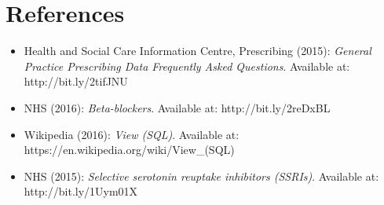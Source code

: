 \documentclass[english,a4paper,]{report}
\begin{document}
\chapter{References}\label{references}

\begin{itemize}
\item
  Health and Social Care Information Centre, Prescribing (2015):
  \emph{General Practice Prescribing Data Frequently Asked Questions}.
  Available at: http://bit.ly/2tifJNU
\item
  NHS (2016): \emph{Beta-blockers}. Available at: http://bit.ly/2reDxBL
\item
  Wikipedia (2016): \emph{View (SQL)}. Available at:
  https://en.wikipedia.org/wiki/View\_(SQL)
\item
  NHS (2015): \emph{Selective serotonin reuptake inhibitors (SSRIs)}.
  Available at: http://bit.ly/1Uym01X
\end{itemize}
\end{document}
